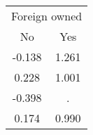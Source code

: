 \begin{tabular}{cc}
\toprule
\multicolumn{2}{c}{Foreign owned} \\
\cmidrule(lr){1-2}
No & Yes \\
\midrule
-0.138 & 1.261 \\
0.228 & 1.001 \\
-0.398 & . \\
0.174 & 0.990 \\
\bottomrule
\end{tabular}
